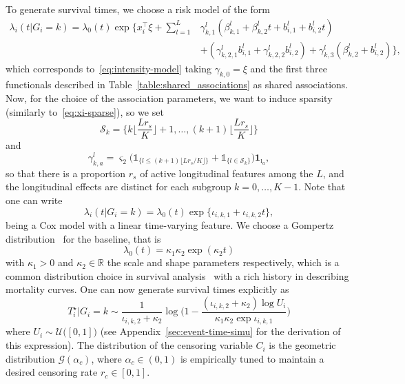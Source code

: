 \documentclass[11pt]{article}
\newcommand{\ind}[1]{\mathds{1}_{#1}}
\newcommand{\cG}{\mathcal G}
\newcommand{\cU}{\mathcal U}
\newcommand{\cS}{\mathcal S}
\newcommand{\R}{\mathds R}
\begin{document}
To generate survival times, we choose a risk model of the form
\begin{align*}
\lambda_i(t|G_i = k) = \lambda_0(t) \exp \Big\{ x_i^\top \xi + \sum_{l=1}^L &\gamma_{k,1}^l (\beta_{k,1}^l + \beta_{k,2}^l t + b_{i,1}^l + b_{i,2}^l t) \\
&+ (\gamma_{k,2,1}^l b_{i,1}^l + \gamma_{k,2,2}^l b_{i,2}^l) + \gamma_{k,3}^l (\beta_{k,2}^l + b_{i,2}^l) \Big\},
\end{align*}
which corresponds to~\eqref{eq:intensity-model} taking $\gamma_{k,0} = \xi$ and the first three functionals described in Table~\ref{table:shared_associations} as shared associations. 
Now, for the choice of the association parameters, we want to induce sparsity (similarly to~\eqref{eq:xi-sparse}), so we set 
\[\cS_k=\Big\{ k \big\lfloor \dfrac{L r_s}{K} \big\rfloor + 1, \ldots,  (k + 1) \big\lfloor \dfrac{L r_s}{K} \big\rfloor \Big\}\] and
\begin{equation}
  \label{eq:gamma-sparse}
  \gamma_{k,a}^l = \varsigma_2 \big(\ind{\{l \leq (k + 1) \lfloor L r_s/K \rfloor \}} + \ind{\{l \in \cS_k \}} \big) \mathbf{1}_{\imath_a},
\end{equation}
so that there is a proportion $r_s$ of active longitudinal features among the $L$, and the longitudinal effects are distinct for each subgroup $k=0, \ldots, K-1$.
Note that one can write
\[ \lambda_i(t|G_i = k) = \lambda_0(t) \exp \big\{ \iota_{i,k,1} + \iota_{i,k,2} t \big\},\]
being a Cox model with a linear time-varying feature.
We choose a Gompertz distribution~\citep{gompertz1825xxiv} for the baseline, that is
\begin{equation}
  \label{eq:baseline}
  \lambda_0(t) = \kappa_1 \kappa_2 \exp(\kappa_2t)
\end{equation}
with $\kappa_1 > 0$ and $\kappa_2 \in \R$ the scale and shape parameters respectively, which is a common distribution choice in survival analysis~\citep{klein2005survival} with a rich history in describing mortality curves. One can now generate survival times explicitly as
\begin{equation}
  \label{eq:time-generation}
  T_i^\star | G_i=k \sim \dfrac{1}{\iota_{i,k,2} + \kappa_2} \log \Big(1 - \dfrac{(\iota_{i,k,2} + \kappa_2) \log U_i}{\kappa_1 \kappa_2 \exp\iota_{i,k,1}} \Big)
\end{equation}
where $U_i \sim \cU\big([0,1]\big)$ (see Appendix~\ref{sec:event-time-simu} for the derivation of this expression).
The distribution of the censoring variable $C_i$ is the geometric distribution $\cG(\alpha_c)$, where $\alpha_c \in (0, 1)$ is empirically tuned to maintain a desired censoring rate $r_c \in [0,1]$. 
\end{document}
